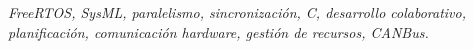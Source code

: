 \begin{center}
  \textit{FreeRTOS, SysML, paralelismo, sincronización, C, desarrollo colaborativo, planificación,
  comunicación hardware, gestión de recursos, CANBus.}
\end{center}
